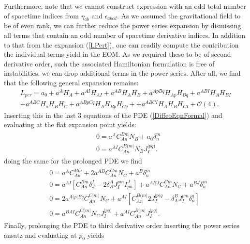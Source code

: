 Furthermore, note that we cannot construct expression with an odd total number of spacetime indices from $\eta_{ab}$ and $\epsilon_{abcd}$. As we assumed the gravitational field to be of even rank, we can further reduce the power series expansion by dismissing all terms that contain an odd number of spacetime derivative indices. In addition to that from the expansion (\ref{LPert}), one can readily compute the contribution the individual terms yield in the EOM.  As we required these to be of second derivative order, such the associated Hamiltonian formulation is free of instabilities, we can drop additional terms in the power series. After all, we find that the following general expansion remains: 
\begin{multline}\label{LperRed}
     L_{per} = a_0 + a^A H_A + a^{AI}H_{AI} + a^{AB} H_{A}H_{B} + a^{ApBq} H_{Ap}H_{Bq} + a^{ABI} H_{A} H_{BI} \\
    + a^{ABC} H_a H_B H_C + a^{ABpCq} H_{A}H_{Bp}H_{Cq} +
    + a^{ABCI} H_A H_B H_{CI} 
    + \mathcal{O}(4).
\end{multline}
Inserting this in the last 3 equations of the PDE (\ref{DiffeoEqnFormal}) and evaluating at the flat expansion point yields:
\begin{align}\label{order1}
    \begin{aligned}
    &0 = a^A C_{An}^{Bm}N_B + a_0 \delta^m_n\\
    &0 = a^{AI}C_{An}^{B(m\vert }N_B J^{\vert pq)}_I.
    \end{aligned}
\end{align}
doing the same for the prolonged PDE we find 
\begin{align}\label{order2}
    \begin{aligned}
    &0 = a^A C_{An}^{Bm} + 2 a^{AB}C_{An}^{Cm}N_C + a^B\delta^m_n\\
    &0 = a^{AI}\left [C_{An}^{Bm}\delta^I _J- 2 \delta^A_B J_I^{pm}I^J_{pn} \right ] + a^{ABJ}C_{An}^{Cm}N_C + a^{BJ} \delta^m_n \\
    &0 = 2a^{A(p\vert Bq}C_{An}^{C\vert m)}N_C + a^{AI} \left [C_{An}^{B(m\vert} 2 J_{I}^{\vert p)q} - \delta_A^BJ_I^{pm}\delta^q_n \right ]\\
    &0 = a^{BAI}C_{An}^{C(m\vert}N_CJ_I^{\vert pq)} + a^{AI}C_{An}^{B(m \vert} J_I^{\vert pq)}.
    \end{aligned}
\end{align}
Finally, prolonging the PDE to third derivative order inserting the power series ansatz and evaluating at $p_0$ yields
